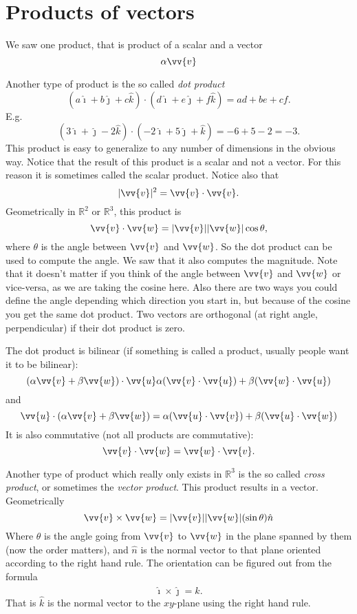 \documentclass[11pt]{article}
\newcommand{\sabs}[1]{\lvert {#1} \rvert}
\newcommand{\R}{{\mathbb{R}}}
\newcommand{\veci}{\hat{\imath}}
\newcommand{\vecj}{\hat{\jmath}}
\newcommand{\veck}{\hat{k}}
\begin{document}

\section{Products of vectors}

We saw one product, that is product of a scalar and a vector
$$
\alpha \vv{v}
$$

Another type of product is the so called \emph{dot product}
$$
( a \veci + b \vecj + c \veck ) \cdot
( d \veci + e \vecj + f \veck ) =
ad + be + cf .
$$
E.g.
$$
( 3 \veci + \vecj -2 \veck ) \cdot
( - 2\veci + 5 \vecj + \veck ) =
-6 + 5 -2 = -3 .
$$
This product is easy to generalize to any number of dimensions in the obvious way.
Notice that the result of this product is a scalar and not a vector.
For this reason it is sometimes called the scalar product.
Notice also that
$$
\sabs{\vv{v}}^2 = \vv{v} \cdot \vv{v} .
$$
Geometrically in $\R^2$ or $\R^3$, this product is
$$
\vv{v} \cdot \vv{w} = \sabs{\vv{v}} \sabs{\vv{w}} \cos \theta ,
$$
where $\theta$ is the angle between $\vv{v}$ and $\vv{w}$.
So the dot product can be used to compute the angle.
We saw that it also computes the magnitude.
Note that it doesn't matter if you think of the angle
between $\vv{v}$ and $\vv{w}$ or vice-versa, as we are taking the cosine here.
Also there are two ways you could define the angle depending which direction you start in,
but because of the cosine you get the same dot product.
Two vectors are orthogonal
(at right angle, perpendicular) if their dot product is zero.

The dot product is bilinear (if something is called a product, usually people want it to be bilinear):
$$
( \alpha \vv{v} + \beta \vv{w} ) \cdot \vv{u}
\alpha (\vv{v} \cdot \vv{u}) + \beta (\vv{w} \cdot \vv{u})
$$
and
$$
\vv{u} \cdot
( \alpha \vv{v} + \beta \vv{w} )
=
\alpha (\vv{u} \cdot \vv{v}) + \beta (\vv{u} \cdot \vv{w})
$$
It is also commutative (not all products are commutative):
$$
\vv{v} \cdot \vv{w} = \vv{w} \cdot \vv{v} .
$$

Another type of product which really only exists in $\R^3$ is the so called
\emph{cross product},
or sometimes the \emph{vector product}.
This product results in a vector.
Geometrically
$$
\vv{v} \times \vv{w} = \sabs{\vv{v}} \sabs{\vv{w}} (\sin \theta) \hat{n}
$$
Where $\theta$ is the angle going from $\vv{v}$ to $\vv{w}$ in the plane spanned by them
(now the order matters),
and $\hat{n}$ is the normal vector to that plane oriented according to the right hand rule.
The orientation can be figured out from the formula
$$
\veci \times \vecj = \veck .
$$
That is $\veck$ is the normal vector to the $xy$-plane using the right hand rule.
\end{document}
